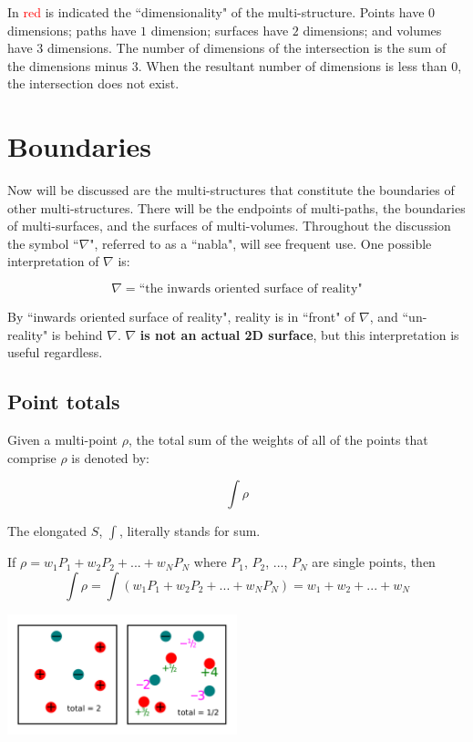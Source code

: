 \documentclass{book}
\newcommand{\red}[1]{\textcolor{red}{#1}}
\begin{document}
\vspace{5mm}

In \red{red} is indicated the ``dimensionality" of the multi-structure. Points have \(0\) dimensions; paths have \(1\) dimension; surfaces have \(2\) dimensions; and volumes have \(3\) dimensions. The number of dimensions of the intersection is the sum of the dimensions minus \(3\). When the resultant number of dimensions is less than \(0\), the intersection does not exist.





\chapter{Boundaries}

Now will be discussed are the multi-structures that constitute the boundaries of other multi-structures. There will be the endpoints of multi-paths, the boundaries of multi-surfaces, and the surfaces of multi-volumes. Throughout the discussion the symbol ``\(\nabla\)", referred to as a ``nabla", will see frequent use. One possible interpretation of \(\nabla\) is:

\[\nabla = \text{``the inwards oriented surface of reality"}\]

By ``inwards oriented surface of reality", reality is in ``front" of \(\nabla\), and ``un-reality" is behind \(\nabla\). \(\nabla\) {\bf is not an actual 2D surface}, but this interpretation is useful regardless.



\section{Point totals}

Given a multi-point \(\rho\), the total sum of the weights of all of the points that comprise \(\rho\) is denoted by:

\[\int \rho\]

The elongated \(S\), \(\int\), literally stands for sum.

If \(\rho = w_1 P_1 + w_2 P_2 + ... + w_N P_N\) where \(P_1\), \(P_2\), ..., \(P_N\) are single points, then
\[\int \rho = \int (w_1 P_1 + w_2 P_2 + ... + w_N P_N) = w_1 + w_2 + ... + w_N\]

\begin{center} 
\includegraphics[width = 0.5\textwidth]{Point_totals/multi-point_sums}
\end{center}
\end{document}
